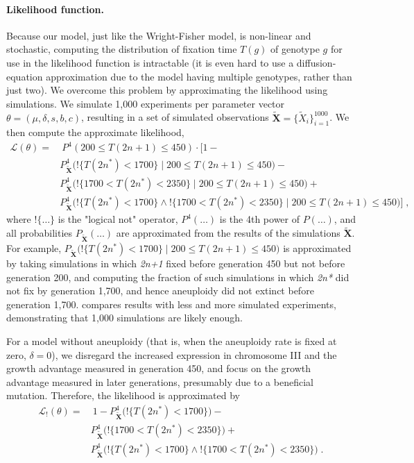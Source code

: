 \documentclass[12pt]{extarticle}
\let\vec\mathbf
\newcommand{\likelihood}{\mathcal{L}}
\newcommand{\anwt}{\emph{2n+1}}
\newcommand{\eumt}{\emph{2n*}}
\begin{document}
\paragraph{Likelihood function.} 
Because our model, just like the Wright-Fisher model, is non-linear and stochastic, computing the distribution of fixation time $T(g)$ of genotype $g$ for use in the likelihood function is intractable (it is even hard to use a diffusion-equation approximation due to the model having multiple genotypes, rather than just two).
We overcome this problem by approximating the likelihood using simulations. We simulate 1,000 experiments per parameter vector $\theta = (\mu, \delta, s, b, c)$, resulting in a set of simulated observations $\tilde{\vec X} = \{\tilde{X}_i\}_{i=1}^{1000}$. We then compute the approximate likelihood,
\begin{equation}\begin{aligned}
\label{eq:heatstress-likelihood}
\likelihood(\theta) = &\ P^4(200 \le T(2n+1) \le 450) \cdot 
	\Big[1 - \\
	&	P_{\tilde{\vec X}}^4\big(!\{T(2n^*)<1700\} \mid 200 \le T(2n+1) \le 450\big)- \\
	&	P_{\tilde{\vec X}}^4\big(!\{1700 < T(2n^*) < 2350\} \mid 200 \le T(2n+1) \le 450\big)+ \\
	&	P_{\tilde{\vec X}}^4\big(!\{T(2n^*)<1700\} \land !\{1700 < T(2n^*) < 2350\} \mid 200 \le T(2n+1) \le 450\big) 
	\Big]\;,
\end{aligned}\end{equation}
where $!\{\ldots\}$ is the "logical not" operator, $P^4(\ldots)$ is the 4th power of $P(\ldots)$, and all probabilities $P_{\tilde{\vec X}}(\ldots)$ are approximated from the results of the simulations $\tilde{\vec X}$. For example, $P_{\tilde{\vec X}}\big(!\{T(2n^*)<1700\} \mid 200 \le T(2n+1) \le 450\big)$ is approximated by taking simulations in which \anwt\; fixed before generation 450 but not before generation 200, and computing the fraction of such simulations in which \eumt\; did not fix by generation 1,700, and hence aneuploidy did not extinct before generation 1,700.
 compares results with less and more simulated experiments, demonstrating that 1,000 simulations are likely enough.
 
For a model without aneuploidy (that is, when the aneuploidy rate is fixed at zero, $\delta=0$), we disregard the increased expression in chromosome III and the growth advantage measured in generation 450, and focus on the growth advantage measured in later generations, presumably due to a beneficial mutation. 
Therefore, the likelihood is approximated by
\begin{equation}\begin{aligned}
\label{eq:heatstress-noaneuploidy-likelihood}
\likelihood_{!}(\theta) = &\ 
	1 - 
	P_{\tilde{\vec X}}^4\big(!\{T(2n^*)<1700\}\big) - \\
&	P_{\tilde{\vec X}}^4\big(!\{1700 < T(2n^*) < 2350\}\big) + \\
&	P_{\tilde{\vec X}}^4\big(!\{T(2n^*)<1700\} \land !\{1700 < T(2n^*) < 2350\}\big)
\;.
\end{aligned}\end{equation}
\end{document}
